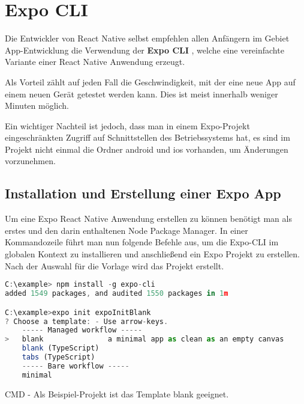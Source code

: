 \section{Expo CLI}
\label{expocli}
Die Entwickler von React Native selbst empfehlen allen Anfängern im Gebiet App-Entwicklung die
Verwendung der \textbf{Expo CLI} \cite{expocli}, welche eine vereinfachte Variante einer React Native Anwendung erzeugt.

Als Vorteil zählt auf jeden Fall die Geschwindigkeit, mit der eine neue App auf einem neuen Gerät
getestet werden kann. Dies ist meist innerhalb weniger Minuten möglich.

Ein wichtiger Nachteil ist jedoch, dass man in einem Expo-Projekt eingeschränkten Zugriff auf
Schnittstellen des Betriebssystems hat, es sind im Projekt nicht einmal die Ordner android und ios
vorhanden, um Änderungen vorzunehmen.

\subsection{Installation und Erstellung einer Expo App}
Um eine Expo React Native Anwendung erstellen zu können benötigt man als erstes \underline{} und
den darin enthaltenen Node Package Manager. In einer Kommandozeile führt man nun folgende Befehle
aus, um die Expo-CLI im globalen Kontext zu installieren und anschließend ein Expo Projekt zu
erstellen. Nach der Auswahl für die Vorlage wird das Projekt erstellt.


\begin{code}[htp]
\begin{lstlisting}[firstnumber=1,language=JavaScript, style=CMD]
C:\example> npm install -g expo-cli
added 1549 packages, and audited 1550 packages in 1m

C:\example>expo init expoInitBlank
? Choose a template: - Use arrow-keys.
    ----- Managed workflow -----
>   blank               a minimal app as clean as an empty canvas
    blank (TypeScript)
    tabs (TypeScript)
    ----- Bare workflow -----
    minimal
\end{lstlisting}
\caption{CMD - Als Beispiel-Projekt ist das Template blank geeignet.}
\end{code}


